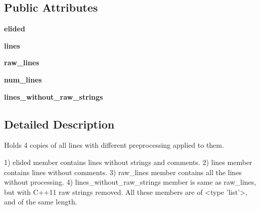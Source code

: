 \subsection*{Public Attributes}
\begin{DoxyCompactItemize}
\item 
\hypertarget{classcpplint_1_1CleansedLines_aa4d0a4d5081675c01656a5d86d99e8bd}{{\bfseries elided}}\label{classcpplint_1_1CleansedLines_aa4d0a4d5081675c01656a5d86d99e8bd}

\item 
\hypertarget{classcpplint_1_1CleansedLines_a9cd74bd010da1610a46322d6821bd06a}{{\bfseries lines}}\label{classcpplint_1_1CleansedLines_a9cd74bd010da1610a46322d6821bd06a}

\item 
\hypertarget{classcpplint_1_1CleansedLines_a9e94ce9e4f682be33c04fe82429c4dfd}{{\bfseries raw\-\_\-lines}}\label{classcpplint_1_1CleansedLines_a9e94ce9e4f682be33c04fe82429c4dfd}

\item 
\hypertarget{classcpplint_1_1CleansedLines_a4b42ab48659954fb6e0a4e4eb483a45a}{{\bfseries num\-\_\-lines}}\label{classcpplint_1_1CleansedLines_a4b42ab48659954fb6e0a4e4eb483a45a}

\item 
\hypertarget{classcpplint_1_1CleansedLines_a0cc228ba3c00ba590b27a759cf8023ce}{{\bfseries lines\-\_\-without\-\_\-raw\-\_\-strings}}\label{classcpplint_1_1CleansedLines_a0cc228ba3c00ba590b27a759cf8023ce}

\end{DoxyCompactItemize}


\subsection{Detailed Description}
\begin{DoxyVerb}Holds 4 copies of all lines with different preprocessing applied to them.

1) elided member contains lines without strings and comments.
2) lines member contains lines without comments.
3) raw_lines member contains all the lines without processing.
4) lines_without_raw_strings member is same as raw_lines, but with C++11 raw
   strings removed.
All these members are of <type 'list'>, and of the same length.
\end{DoxyVerb}
 

